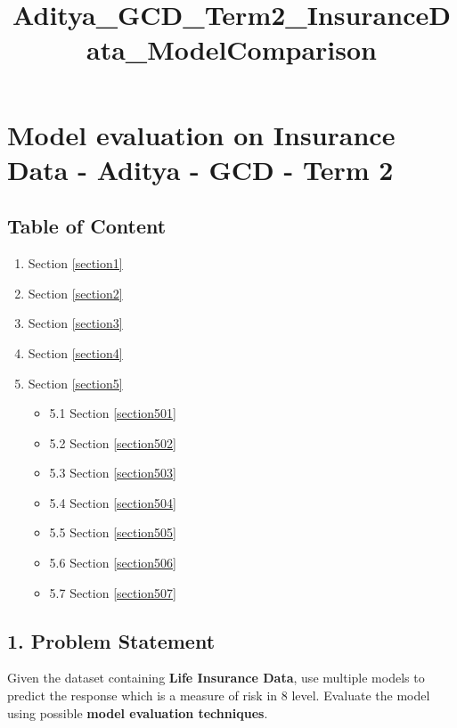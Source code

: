 \documentclass[11pt]{article}
\title{Aditya\_GCD\_Term2\_InsuranceData\_ModelComparison}
\providecommand{\tightlist}{%
      \setlength{\itemsep}{0pt}\setlength{\parskip}{0pt}}
\begin{document}
    
    
    \maketitle
    
    

    
    \section{Model evaluation on Insurance Data - Aditya - GCD - Term
2}\label{model-evaluation-on-insurance-data---aditya---gcd---term-2}

    \subsection{Table of Content}\label{table-of-content}

\begin{enumerate}
\def\labelenumi{\arabic{enumi}.}
\tightlist
\item
  Section \ref{section1}
\item
  Section \ref{section2}
\item
  Section \ref{section3}
\item
  Section \ref{section4}
\item
  Section \ref{section5}

  \begin{itemize}
  \tightlist
  \item
    5.1 Section \ref{section501}
  \item
    5.2 Section \ref{section502}
  \item
    5.3 Section \ref{section503}
  \item
    5.4 Section \ref{section504}
  \item
    5.5 Section \ref{section505}
  \item
    5.6 Section \ref{section506}
  \item
    5.7 Section \ref{section507}
  \end{itemize}
\end{enumerate}

    

    \subsection{1. Problem Statement}\label{problem-statement}

Given the dataset containing \textbf{Life Insurance Data}, use multiple
models to predict the response which is a measure of risk in 8 level.
Evaluate the model using possible \textbf{model evaluation techniques}.
\end{document}
